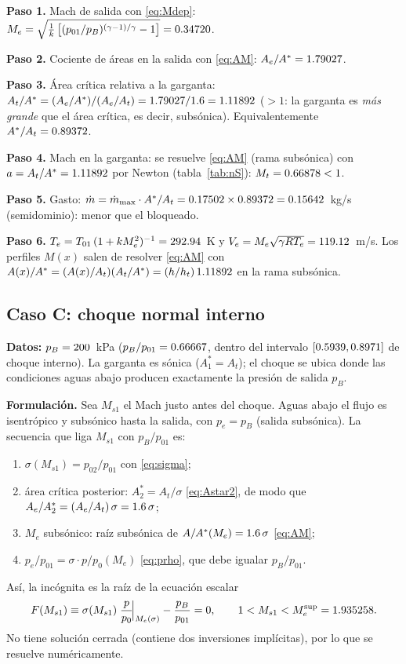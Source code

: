 \documentclass[11pt,a4paper]{article}
\newcommand{\As}{A^{*}}
\newcommand{\Msone}{M_{s1}}\newcommand{\Mstwo}{M_{s2}}
\begin{document}
\textbf{Paso 1.} Mach de salida con \eqref{eq:Mdep}: $M_e=\sqrt{\tfrac{1}{k}\left[(p_{01}/p_B)^{(\gamma-1)/\gamma}-1\right]}=0.34720$.

\textbf{Paso 2.} Cociente de áreas en la salida con \eqref{eq:AM}: $A_e/\As=\AeAsS$.

\textbf{Paso 3.} Área crítica relativa a la garganta: $A_t/\As=(A_e/\As)/(A_e/A_t)=\AeAsS/\ARr=\AtAsS$ ($>1$:
la garganta es \emph{más grande} que el área crítica, es decir, subsónica). Equivalentemente $\As/A_t=\AsAtS$.

\textbf{Paso 4.} Mach en la garganta: se resuelve \eqref{eq:AM} (rama subsónica) con $a=A_t/\As=\AtAsS$ por Newton (tabla~\ref{tab:nS}): $M_t=0.66878<1$.

\textbf{Paso 5.} Gasto: $\dot m=\dot m_{\rm max}\cdot\As/A_t=\mdotsemi\times\AsAtS=\mdotS$~kg/s (semidominio): menor que el bloqueado.

\textbf{Paso 6.} $T_e=T_{01}\,(1+kM_e^2)^{-1}=292.94$~K y $V_e=M_e\sqrt{\gamma RT_e}=119.12$~m/s. Los perfiles $M(x)$ salen de resolver \eqref{eq:AM}
con $A(x)/\As=(A(x)/A_t)(A_t/\As)=(h/h_t)\,\AtAsS$ en la rama subsónica.

\begin{table}[H]\centering\small
\caption{Newton para $M_t$ del caso S ($A/\As=\AtAsS$, $M_0=0.5$).}\label{tab:nS}
\end{table}

\subsection{Caso C: choque normal interno}
\textbf{Datos:} $p_B=200$~kPa ($p_B/p_{01}=0.66667$, dentro del intervalo $[0.5939,0.8971]$ de choque interno). La garganta es sónica
($A^*_1=A_t$); el choque se ubica donde las condiciones aguas abajo producen exactamente la presión de salida $p_B$.

\textbf{Formulación.} Sea $\Msone$ el Mach justo antes del choque. Aguas abajo el flujo es isentrópico y subsónico hasta la salida, con $p_e=p_B$ (salida subsónica).
La secuencia que liga $\Msone$ con $p_B/p_{01}$ es:
\begin{enumerate}[label=(\roman*)]
\item $\sigma(\Msone)=p_{02}/p_{01}$ con \eqref{eq:sigma};
\item área crítica posterior: $A^*_2=A_t/\sigma$ \eqref{eq:Astar2}, de modo que $A_e/A^*_2=(A_e/A_t)\,\sigma=1.6\,\sigma$;
\item $M_e$ subsónico: raíz subsónica de $A/\As(M_e)=\ARr\,\sigma$ \eqref{eq:AM};
\item $p_e/p_{01}=\sigma\cdot p/p_0(M_e)$ \eqref{eq:prho}, que debe igualar $p_B/p_{01}$.
\end{enumerate}
Así, la incógnita es la raíz de la ecuación escalar
\begin{equation}
F(\Msone)\equiv\sigma(\Msone)\;\frac{p}{p_0}\!\Big|_{M_e(\sigma)}-\frac{p_B}{p_{01}}=0,\qquad 1<\Msone<M_e^{\rm sup}=\MeSup. \label{eq:F}
\end{equation}
No tiene solución cerrada (contiene dos inversiones implícitas), por lo que se resuelve numéricamente.
\end{document}
